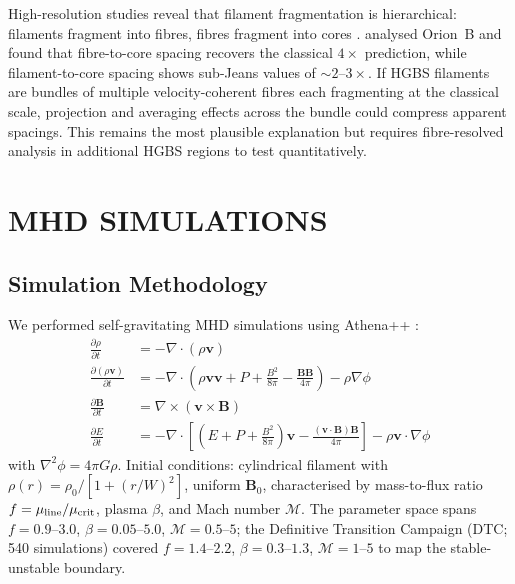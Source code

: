\documentclass[twoside,twocolumn]{mnras}
\begin{document}
High-resolution studies reveal that filament fragmentation is hierarchical: filaments
fragment into fibres, fibres fragment into cores \citep{Hacar2013, Hacar2018}.
\citet{Yang2024} analysed Orion~B and found that fibre-to-core spacing recovers the
classical $4\times$ prediction, while filament-to-core spacing shows sub-Jeans values
of ${\sim}2$--$3\times$. If HGBS filaments are bundles of multiple velocity-coherent
fibres each fragmenting at the classical scale, projection and averaging effects across
the bundle could compress apparent spacings. This remains the most plausible explanation
but requires fibre-resolved analysis in additional HGBS regions to test quantitatively.

\section{MHD SIMULATIONS}

\subsection{Simulation Methodology}

We performed self-gravitating MHD simulations using Athena++ \citep{Stone2020}:
\begin{align}
\frac{\partial \rho}{\partial t} &= -\nabla \cdot (\rho \mathbf{v}) \\
\frac{\partial (\rho \mathbf{v})}{\partial t} &= -\nabla \cdot \left(\rho \mathbf{v} \mathbf{v} + P + \frac{B^2}{8\pi} - \frac{\mathbf{B}\mathbf{B}}{4\pi}\right) - \rho \nabla \phi \\
\frac{\partial \mathbf{B}}{\partial t} &= \nabla \times (\mathbf{v} \times \mathbf{B}) \\
\frac{\partial E}{\partial t} &= -\nabla \cdot \left[\left(E + P + \frac{B^2}{8\pi}\right)\mathbf{v} - \frac{(\mathbf{v} \cdot \mathbf{B})\mathbf{B}}{4\pi}\right] - \rho \mathbf{v} \cdot \nabla \phi
\end{align}
with $\nabla^2 \phi = 4\pi G\rho$. Initial conditions: cylindrical filament with
$\rho(r) = \rho_0 / [1 + (r/W)^2]$, uniform $\mathbf{B}_0$, characterised by
mass-to-flux ratio $f = \mu_{\rm line}/\mu_{\rm crit}$, plasma $\beta$, and
Mach number $\mathcal{M}$. The parameter space spans $f = 0.9$--$3.0$,
$\beta = 0.05$--$5.0$, $\mathcal{M} = 0.5$--$5$; the Definitive Transition Campaign
(DTC; 540 simulations) covered $f = 1.4$--$2.2$, $\beta = 0.3$--$1.3$,
$\mathcal{M} = 1$--$5$ to map the stable-unstable boundary.
\end{document}
